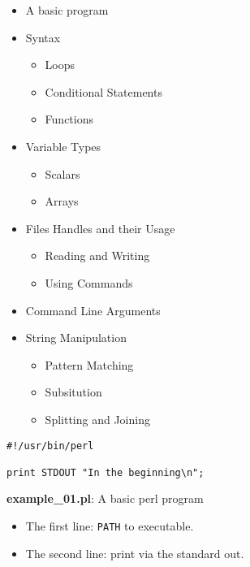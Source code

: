\documentclass[17pt,dvips]{foils}
\begin{document}
\begin{itemize}
\item A basic program
\item Syntax
  \begin{itemize}
  \item Loops
  \item Conditional Statements
  \item Functions
  \end{itemize}
\item Variable Types
  \begin{itemize}
  \item Scalars
  \item Arrays
  \end{itemize}
\item Files Handles and their Usage
  \begin{itemize}
  \item Reading and Writing
  \item Using Commands
  \end{itemize}
\item Command Line Arguments
\item String Manipulation
  \begin{itemize}
  \item Pattern Matching
  \item Subsitution
  \item Splitting and Joining
  \end{itemize}
\end{itemize}


\begin{verbatim}
#!/usr/bin/perl

print STDOUT "In the beginning\n";
\end{verbatim}
{\bf example\_01.pl}: A basic perl program

\begin{itemize}
\item The first line: \texttt{PATH} to executable.
\item The second line: print via the standard out.
\end{itemize}
\end{document}
